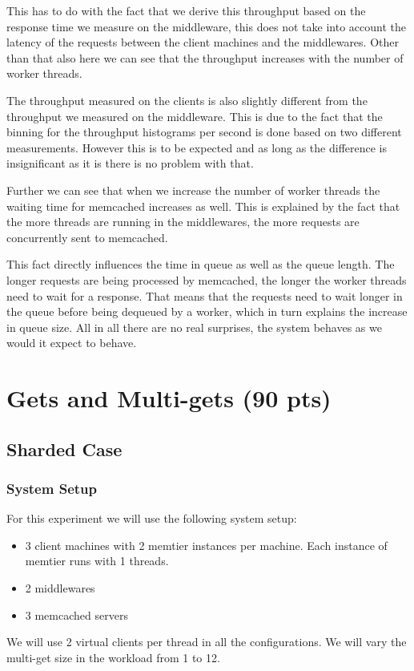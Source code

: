 \documentclass[11pt,a4paper]{article}
\begin{document}
%
This has to do with the fact that we derive this throughput based on the response time we measure on the middleware, this does not take into account the latency of the requests between the client machines and the middlewares.
%
Other than that also here we can see that the throughput increases with the number of worker threads.
%
\par
%
The throughput measured on the clients is also slightly different from the throughput we measured on the middleware. 
%
This is due to the fact that the binning for the throughput histograms per second is done based on two different measurements.
%
However this is to be expected and as long as the difference is insignificant as it is there is no problem with that.
%
\par
%
Further we can see that when we increase the number of worker threads the waiting time for memcached increases as well.
%
This is explained by the fact that the more threads are running in the middlewares, the more requests are concurrently sent to memcached.
%
\par
%
This fact directly influences the time in queue as well as the queue length.
%
The longer requests are being processed by memcached, the longer the worker threads need to wait for a response.
%
That means that the requests need to wait longer in the queue before being dequeued by a worker, which in turn explains the increase in queue size.
%
All in all there are no real surprises, the system behaves as we would it expect to behave.

\section{Gets and Multi-gets (90 pts)}
%
\subsection{Sharded Case}
%
\subsubsection{System Setup}
%
For this experiment we will use the following system setup:
%
\begin{itemize}
	\item 3 client machines with 2 memtier instances per machine. Each instance of memtier runs with 1 threads.
	\item 2 middlewares
	\item 3 memcached servers
\end{itemize}
%
We will use 2 virtual clients per thread in all the configurations.
%
We will vary the multi-get size in the workload from 1 to 12.
%
\end{document}
